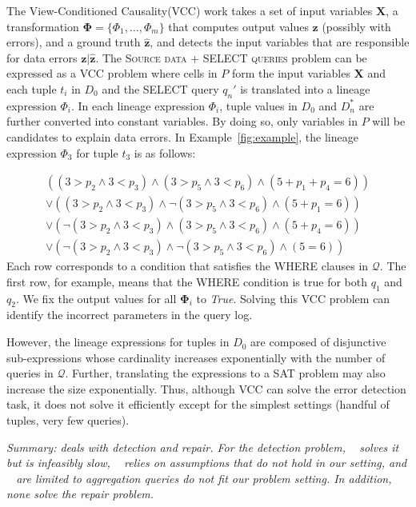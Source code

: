 The View-Conditioned Causality(VCC) work takes a set of input variables
$\mathbf{X}$, a transformation $\mathbf{\Phi} =\{\Phi_1, \dots , \Phi_m\}$
that computes output values $\mathbf{z}$ (possibly with errors), and a ground truth
$\hat{\mathbf{z}}$, and detects the input variables that are responsible for data
errors $\mathbf{z}|\hat{\mathbf{z}}$. The \textsc{Source data + SELECT
queries} problem can be expressed as a VCC problem where cells in $P$ form the
input variables $\mathbf{X}$ and each tuple $t_i$ in $D_0$ and the SELECT
query $q_n'$ is translated into a lineage expression $\Phi_i$. In each lineage
expression $\Phi_i$, tuple values in $D_0$ and $D_n^*$ are further converted
into constant variables. By doing so, only variables in $P$ will be candidates
to explain data errors. In Example~\ref{fig:example}, the lineage expression
$\Phi_3$ for tuple $t_3$ is as follows:

{\small
\begin{eqnarray*}
&((3 > p_2 \wedge 3 < p_3) \wedge (3 > p_5 \wedge 3 < p_6) \wedge (5 + p_1+p_4 = 6)) &\\
&\vee ((3 > p_2 \wedge 3 < p_3) \wedge \neg(3 > p_5 \wedge 3 < p_6) \wedge (5 + p_1= 6))& \\
&\vee (\neg(3 > p_2 \wedge 3 < p_3) \wedge (3 > p_5 \wedge 3 < p_6) \wedge (5 + p_4= 6))& \\
&\vee (\neg(3 > p_2 \wedge 3 < p_3) \wedge \neg(3 > p_5 \wedge 3 < p_6) \wedge (5 = 6))&
\end{eqnarray*}
}
Each row corresponds to a condition that satisfies the WHERE clauses in $\mathcal{Q}$.
The first row, for example, means that the WHERE condition is true for both $q_1$ and $q_2$. 
We fix the output values for all $\mathbf{\Phi}_i$ to \textit{True}. 
Solving this VCC problem can identify the incorrect parameters in the query log. 

However, the lineage expressions for tuples in $D_0$ are composed of disjunctive sub-expressions whose cardinality increases exponentially with the number of queries in $\mathcal{Q}$. 
Further, translating the expressions to a SAT problem may also increase the size exponentially.
Thus, although VCC can solve the error detection task, it does not solve it efficiently except for the simplest settings (handful of tuples, very few queries).

{\it Summary: \sys deals with detection and repair.  
For the detection problem,  ~\cite{meliou2011tracing} solves it but is infeasibly slow, 
~\cite{chalamalla2014} relies on assumptions that do not hold in our setting, 
and ~\cite{Wu13,roy2014formal} are limited to aggregation queries do not fit our problem setting.
In addition, none solve the repair problem.
}


\comskip